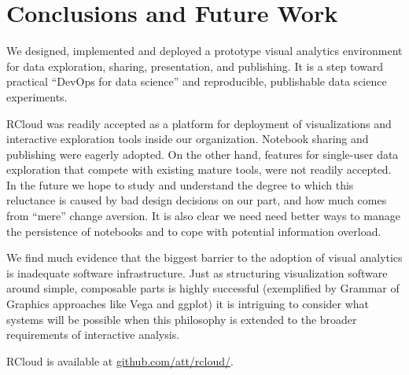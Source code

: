 \section{Conclusions and Future Work}
We designed, implemented and deployed a prototype visual analytics environment
for data exploration, sharing, presentation, and publishing. It is a step toward
practical ``DevOps for data science'' and reproducible, publishable data
science experiments.

RCloud was readily accepted as a platform for deployment of
visualizations and interactive exploration tools inside our organization.  
Notebook sharing and publishing were eagerly adopted.
On the other hand, features for single-user data exploration that
compete with existing mature tools, were not readily accepted.
In the future we hope to study and understand the degree to which
this reluctance is caused by bad design decisions on our part, and how
much comes from ``mere'' change aversion. It is also clear we need
need better ways to manage the persistence of notebooks and to cope
with potential information overload.

We find much evidence that the biggest barrier to the adoption of
visual analytics is inadequate software infrastructure.
Just as structuring visualization software around simple,
composable parts is highly successful (exemplified by
Grammar of Graphics approaches like Vega and ggplot)
it is intriguing to consider what systems will be
possible when this philosophy is extended to the
broader requirements of interactive analysis.

RCloud is available at \url{github.com/att/rcloud/}.
